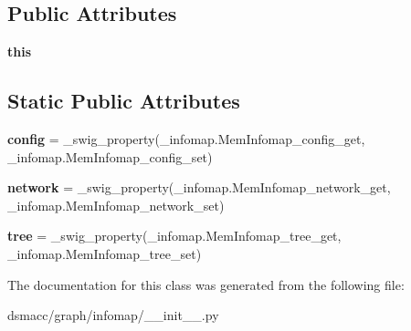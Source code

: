\subsection*{Public Attributes}
\begin{DoxyCompactItemize}
\item 
\mbox{\label{classdsmacc_1_1graph_1_1infomap_1_1MemInfomap_afccf952ee46b1d3a3d8462c066bba624}} 
{\bfseries this}
\end{DoxyCompactItemize}
\subsection*{Static Public Attributes}
\begin{DoxyCompactItemize}
\item 
\mbox{\label{classdsmacc_1_1graph_1_1infomap_1_1MemInfomap_a22d5a1e35b97b6f9ccf17e2f9a3c5939}} 
{\bfseries config} = \+\_\+swig\+\_\+property(\+\_\+infomap.\+Mem\+Infomap\+\_\+config\+\_\+get, \+\_\+infomap.\+Mem\+Infomap\+\_\+config\+\_\+set)
\item 
\mbox{\label{classdsmacc_1_1graph_1_1infomap_1_1MemInfomap_ab720de7f7dd1692e5b6733e53db1aa5e}} 
{\bfseries network} = \+\_\+swig\+\_\+property(\+\_\+infomap.\+Mem\+Infomap\+\_\+network\+\_\+get, \+\_\+infomap.\+Mem\+Infomap\+\_\+network\+\_\+set)
\item 
\mbox{\label{classdsmacc_1_1graph_1_1infomap_1_1MemInfomap_a16c49432c5b309866c6e8a7adeaccdcc}} 
{\bfseries tree} = \+\_\+swig\+\_\+property(\+\_\+infomap.\+Mem\+Infomap\+\_\+tree\+\_\+get, \+\_\+infomap.\+Mem\+Infomap\+\_\+tree\+\_\+set)
\end{DoxyCompactItemize}


The documentation for this class was generated from the following file\+:\begin{DoxyCompactItemize}
\item 
dsmacc/graph/infomap/\+\_\+\+\_\+init\+\_\+\+\_\+.\+py\end{DoxyCompactItemize}
